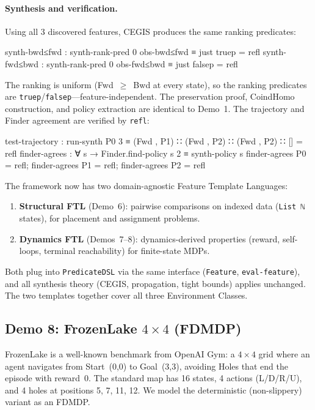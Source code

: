 \paragraph{Synthesis and verification.}
Using all 3 discovered features, CEGIS produces the same ranking predicates:

\begin{spec}
synth-bwd≤fwd : synth-rank-pred 0 obs-bwd≤fwd ≡ just truep  = refl
synth-fwd≤bwd : synth-rank-pred 0 obs-fwd≤bwd ≡ just falsep = refl
\end{spec}

\noindent The ranking is uniform (Fwd~$\geq$~Bwd at every state), so the ranking predicates are \texttt{truep}/\texttt{falsep}---feature-independent.  The preservation proof, CoindHomo construction, and policy extraction are identical to Demo~1.  The trajectory and Finder agreement are verified by \texttt{refl}:

\begin{spec}
test-trajectory : run-synth P0 3
  ≡ (Fwd , P1) ∷ (Fwd , P2) ∷ (Fwd , P2) ∷ []   = refl
finder-agrees : ∀ s → Finder.find-policy s 2 ≡ synth-policy s
finder-agrees P0 = refl;  finder-agrees P1 = refl;  finder-agrees P2 = refl
\end{spec}

\begin{remark}
The framework now has two domain-agnostic Feature Template Languages:
\begin{enumerate}
\item \textbf{Structural FTL} (Demo~6): pairwise comparisons on indexed data (\texttt{List~ℕ} states), for placement and assignment problems.
\item \textbf{Dynamics FTL} (Demos~7--8): dynamics-derived properties (reward, self-loops, terminal reachability) for finite-state MDPs.
\end{enumerate}
Both plug into \texttt{PredicateDSL} via the same interface (\texttt{Feature}, \texttt{eval-feature}), and all synthesis theory (CEGIS, propagation, tight bounds) applies unchanged.  The two templates together cover all three Environment Classes.
\end{remark}


\subsection{Demo 8: FrozenLake \texorpdfstring{$4 \times 4$}{4x4} (FDMDP)}
\label{sec:e2e-frozenlake}

FrozenLake is a well-known benchmark from OpenAI Gym: a $4 \times 4$ grid where an agent navigates from Start~(0,0) to Goal~(3,3), avoiding Holes that end the episode with reward~0.  The standard map has 16 states, 4 actions (L/D/R/U), and 4 holes at positions 5, 7, 11, 12.  We model the deterministic (non-slippery) variant as an FDMDP.

